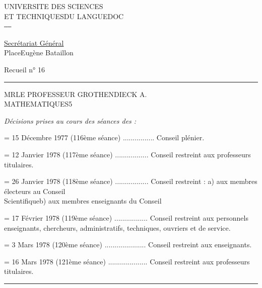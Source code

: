 UNIVERSITE DES SCIENCES\\
ET TECHNIQUES\quad DU LANGUEDOC\\
\texttt{-----}

\uline{Secrétariat Général}\\
Place\quad Eugène Bataillon\\


Recueil n° 16

\rule{1em}{.35pt}

MR\quad LE PROFESSEUR GROTHENDIECK A.\\
MATHEMATIQUES\hfill 5


\textit{Décisions prises au cours des séances des :}

= 15 Décembre 1977 (116ème séance) ................ Conseil plénier.

= 12 Janvier 1978 (117ème séance) ................. Conseil restreint aux professeurs titulaires.

= 26 Janvier 1978 (118ème séance) ................. Conseil restreint : a) aux membres électeurs au Conseil\\
\hspace*{1em}Scientifique\qquad b) aux membres enseignants du Conseil

= 17 Février 1978 (119ème séance) ................. Conseil restreint aux personnels enseignants, chercheurs, administratifs, techniques, ouvriers et de service.

= 3 Mars 1978 (120ème séance) ..................... Conseil restreint aux enseignants.

= 16 Mars 1978 (121ème séance) .................... Conseil restreint aux professeurs titulaires.

\rule{1em}{.8pt}


